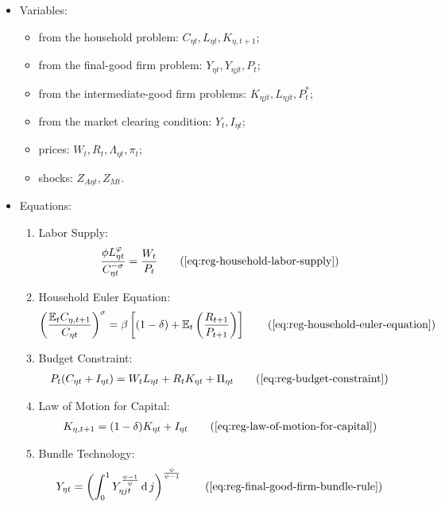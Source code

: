 \documentclass[
	thesis.tex
	]{subfiles}
\begin{document}
{\singlespacing
	
	\begin{itemize}
		\item Variables:
		
		\begin{itemize}
			\item from the household problem: $C_{\eta t}, L_{\eta t}, K_{\eta, t+1}$;
			\item from the final-good firm problem: $Y_{\eta t}, Y_{\eta jt}, P_t$;
			\item from the intermediate-good firm problems: $K_{\eta jt}, L_{\eta jt}, P_t^\ast$;
			\item from the market clearing condition: $Y_t, I_{\eta t}$;
			\item prices: $W_t, R_t, \Lambda_{\eta t}, \pi_t$;
			\item shocks: $Z_{A\eta t}, Z_{Mt}$.
		\end{itemize}
		\item Equations:
		
		\begin{enumerate}
			\item Labor Supply:
			\begin{align}
				\frac{\phi L_{\eta t}^{\varphi}}{C_{\eta t}^{-\sigma}} = \frac{W_t}{P_t}
				\tag{\ref{eq:reg-household-labor-supply}}
			\end{align}
			
			\item Household Euler Equation:
			\begin{align}
				\left( \frac{\mathbb{E}_t C_{\eta, t+1}}{C_{\eta t}} \right)^\sigma = \beta \left[ (1-\delta) + \mathbb{E}_t \left(\frac{R_{t+1}}{P_{t+1}}\right) \right]
				\tag{\ref{eq:reg-household-euler-equation}}
			\end{align}
			
			\item Budget Constraint: 
			\begin{align}
				P_t (C_{\eta t} + I_{\eta t}) = W_t L_{\eta t} + R_t K_{\eta t} + \Pi_{\eta t}
				\tag{\ref{eq:reg-budget-constraint}}
			\end{align}
			
			\item Law of Motion for Capital:
			\begin{align}
				K_{\eta, t+1} = (1-\delta)K_{\eta t} + I_{\eta t}
				\tag{\ref{eq:reg-law-of-motion-for-capital}}
			\end{align}
			
			\item Bundle Technology:
			\begin{align}
				Y_{\eta t} = \left( \int_{0}^{1} Y_{\eta jt}^{\frac{\psi-1}{\psi}} \dif j \right)^{\frac{\psi}{\psi-1}}
				\tag{\ref{eq:reg-final-good-firm-bundle-rule}}
			\end{align}
			

\end{enumerate}
\end{itemize}}
\end{document}
